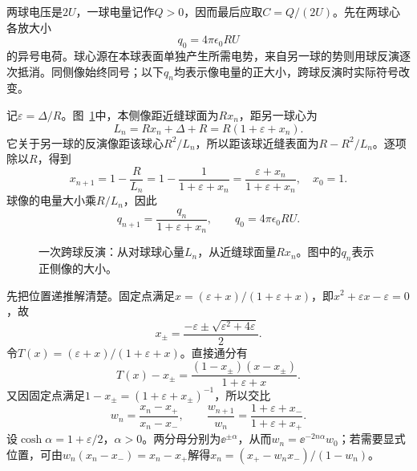 \begin{solution}
两球电压是$2U$，一球电量记作$Q>0$，因而最后应取$C=Q/(2U)$。先在两球心各放大小
\[q_0=4\pi\epsilon_0RU\]
的异号电荷。球心源在本球表面单独产生所需电势，来自另一球的势则用球反演逐次抵消。同侧像始终同号；以下$q_n$均表示像电量的正大小，跨球反演时实际符号改变。

记$\varepsilon=\Delta/R$。图~\ref{fig:es3-e6-rec}中，本侧像距近缝球面为$Rx_n$，距另一球心为
\[L_n=Rx_n+\Delta+R=R(1+\varepsilon+x_n).\]
它关于另一球的反演像距该球心$R^2/L_n$，所以距该球近缝表面为$R-R^2/L_n$。逐项除以$R$，得到
\[x_{n+1}=1-\frac{R}{L_n}=1-\frac1{1+\varepsilon+x_n}
=\frac{\varepsilon+x_n}{1+\varepsilon+x_n},\quad x_0=1.
\]
球像的电量大小乘$R/L_n$，因此
\[q_{n+1}=\frac{q_n}{1+\varepsilon+x_n},\qquad q_0=4\pi\epsilon_0RU.
\]

\begin{figure}[H]\centering
{}
\caption{一次跨球反演：从对球球心量$L_n$，从近缝球面量$Rx_n$。图中的$q_n$表示正侧像的大小。}\label{fig:es3-e6-rec}
\end{figure}

先把位置递推解清楚。固定点满足$x=(\varepsilon+x)/(1+\varepsilon+x)$，即$x^2+\varepsilon x-\varepsilon=0$，故
\[x_\pm=\frac{-\varepsilon\pm\sqrt{\varepsilon^2+4\varepsilon}}2.
\]
令$T(x)=(\varepsilon+x)/(1+\varepsilon+x)$。直接通分有
\[T(x)-x_\pm=\frac{(1-x_\pm)(x-x_\pm)}{1+\varepsilon+x}.
\]
又因固定点满足$1-x_\pm=(1+\varepsilon+x_\pm)^{-1}$，所以交比
\[w_n=\frac{x_n-x_+}{x_n-x_-},\qquad
\frac{w_{n+1}}{w_n}=\frac{1+\varepsilon+x_-}{1+\varepsilon+x_+}.
\]
设$\cosh\alpha=1+\varepsilon/2$，$\alpha>0$。两分母分别为$\ee^{\pm\alpha}$，从而$w_n=\ee^{-2n\alpha}w_0$；若需要显式位置，可由$w_n(x_n-x_-)=x_n-x_+$解得$x_n=(x_+-w_nx_-)/(1-w_n)$。


\end{solution}
